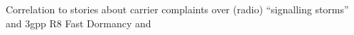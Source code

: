 Correlation to stories about carrier complaints over (radio) ``signalling storms''  and 3gpp R8 Fast Dormancy \cite{3gpp25.331} and \cite{gsma2011fdbestpract}














